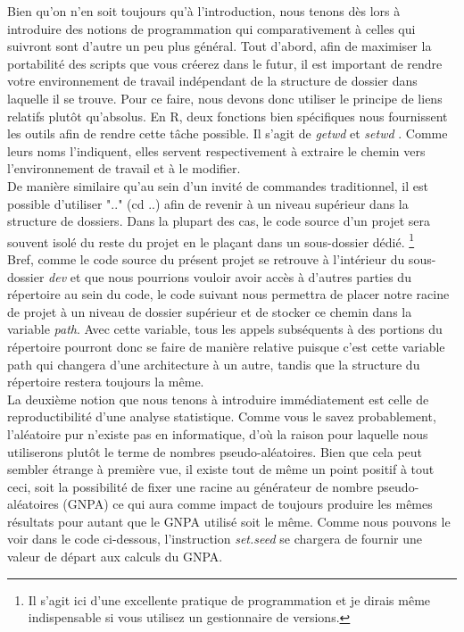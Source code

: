 \noindent
Bien qu'on n'en soit toujours qu'à l'introduction, nous tenons dès lors à introduire des notions de programmation qui comparativement à celles qui suivront sont d'autre un peu plus général. Tout d'abord, afin de maximiser la portabilité des scripts que vous créerez dans le futur, il est important de rendre votre environnement de travail indépendant de la structure de dossier dans laquelle il se trouve. Pour ce faire, nous devons donc utiliser le principe de liens relatifs plutôt qu'absolus. En R, deux fonctions bien spécifiques nous fournissent les outils afin de rendre cette tâche possible. Il s'agit de \emph{getwd} et \emph{setwd} \cite{Rfunction:setwd}. Comme leurs noms l'indiquent, elles servent respectivement à extraire le chemin vers l'environnement de travail et à le modifier. \\

\noindent
De manière similaire qu'au sein d'un invité de commandes traditionnel, il est possible d'utiliser ".." (cd ..) afin de revenir à un niveau supérieur dans la structure de dossiers. Dans la plupart des cas, le code source d'un projet sera souvent isolé du reste du projet en le plaçant dans un sous-dossier dédié. \footnote{Il s'agit ici d'une excellente pratique de programmation et je dirais même indispensable si vous utilisez un gestionnaire de versions.} \\

\noindent
Bref, comme le code source du présent projet se retrouve à l'intérieur du sous-dossier \emph{dev} \cite{repo:RAQ} et que nous pourrions vouloir avoir accès à d'autres parties du répertoire au sein du code, le code suivant nous permettra de placer notre racine de projet à un niveau de dossier supérieur et de stocker ce chemin dans la variable \emph{path}. Avec cette variable, tous les appels subséquents à des portions du répertoire pourront donc se faire de manière relative puisque c'est cette variable path qui changera d'une architecture à un autre, tandis que la structure du répertoire restera toujours la même. \\

\noindent
La deuxième notion que nous tenons à introduire immédiatement est celle de reproductibilité d'une analyse statistique. Comme vous le savez probablement, l'aléatoire pur n'existe pas en informatique, d'où la raison pour laquelle nous utiliserons plutôt le terme de nombres pseudo-aléatoires. Bien que cela peut sembler étrange à première vue, il existe tout de même un point positif à tout ceci, soit la possibilité de fixer une racine au générateur de nombre pseudo-aléatoires (GNPA) ce qui aura comme impact de toujours produire les mêmes résultats pour autant que le GNPA utilisé soit le même. Comme nous pouvons le voir dans le code ci-dessous, l'instruction \emph{set.seed} \cite{Rfunction:setseed} se chargera de fournir une valeur de départ aux calculs du GNPA.

